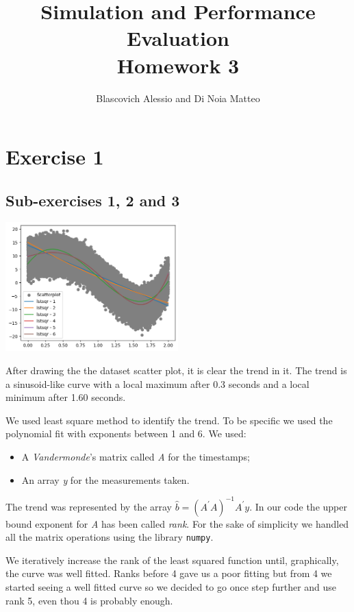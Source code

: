 \documentclass[10pt,a4paper]{article}
\title{
  {\Huge Simulation and Performance Evaluation}\\
  \huge Homework 3 \\
}
\author{Blascovich Alessio and Di Noia Matteo}
\begin{document}
\maketitle

\section*{Exercise 1}

\subsection*{Sub-exercises 1, 2 and 3}

\begin{center}
  \includegraphics[width=0.5\textwidth]{point1.png}
\end{center}

After drawing the the dataset scatter plot, it is clear the trend in it. The trend is a sinusoid-like curve with a local maximum after 0.3 seconds and a local minimum after 1.60 seconds. 

We used least square method to identify the trend. To be specific we used the polynomial fit with exponents between 1 and 6. We used:
\begin{itemize}
\item A \emph{Vandermonde}'s matrix called \emph{A} for the timestamps;
\item An array \emph{y} for the measurements taken.
\end{itemize}
The trend was represented by the array \(\hat{b} = (A^\prime A)^{-1} A^\prime y\). In our code the upper bound exponent for \emph{A} has been called \emph{rank}. For the sake of simplicity we handled all the matrix operations using the library \texttt{numpy}.

We iteratively increase the rank of the least squared function until, graphically, the curve was well fitted. Ranks before 4 gave us a poor fitting but from 4 we started seeing a well fitted curve so we decided to go once step further and use rank 5, even thou 4 is probably enough.
\end{document}
